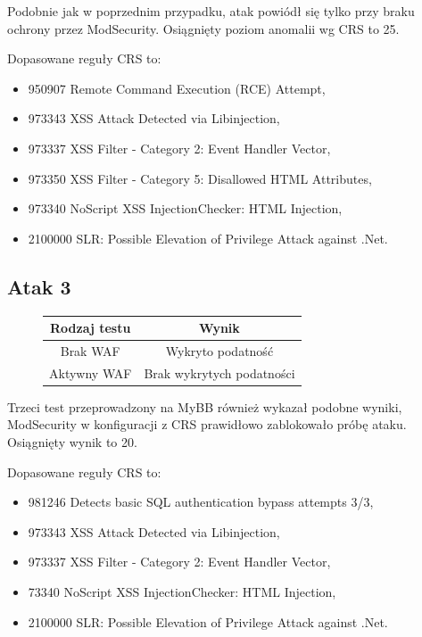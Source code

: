 \documentclass[11pt,a4paper,polish,thesis]{dcsbook}
\begin{document}
Podobnie jak w poprzednim przypadku, atak powiódł się tylko przy braku ochrony przez ModSecurity. Osiągnięty poziom anomalii wg CRS to 25.

Dopasowane reguły CRS to:
\begin{itemize}
\item 950907	Remote Command Execution (RCE) Attempt,
\item 973343	XSS Attack Detected via Libinjection,
\item 973337	XSS Filter - Category 2: Event Handler Vector,
\item 973350	XSS Filter - Category 5: Disallowed HTML Attributes,
\item 973340	NoScript XSS InjectionChecker: HTML Injection,
\item 2100000	SLR: Possible Elevation of Privilege Attack against .Net.
\end{itemize}


\FloatBarrier

\subsection*{Atak 3}
\FloatBarrier
\begin{figure}[!htbp]
\centering
\begin{tabular}{|c|c|}
\hline 
\textbf{Rodzaj testu} & \textbf{Wynik} \\ 
\hline 
Brak WAF & Wykryto podatność \\ 
\hline 
Aktywny WAF & Brak wykrytych podatności \\ 
\hline 
\end{tabular} 

\end{figure}

Trzeci test przeprowadzony na MyBB również wykazał podobne wyniki, ModSecurity w konfiguracji z CRS prawidłowo zablokowało próbę ataku. Osiągnięty wynik to 20.

Dopasowane reguły CRS to:
\begin{itemize}
\item 981246	Detects basic SQL authentication bypass attempts 3/3,
\item 973343	XSS Attack Detected via Libinjection,
\item 973337	XSS Filter - Category 2: Event Handler Vector,
\item 73340	NoScript XSS InjectionChecker: HTML Injection,
\item 2100000	SLR: Possible Elevation of Privilege Attack against .Net.
\end{itemize}
\end{document}
